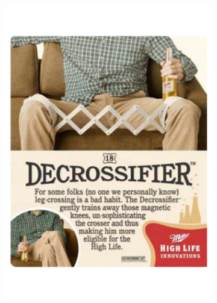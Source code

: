 \begin{figure}
\begin{subfigure}[b]{0.3\textwidth}
     \end{subfigure}
     \begin{subfigure}[b]{0.3\textwidth}
         \centering
         \includegraphics[width=\textwidth,scale=0.5]{images/humans_concreteness_img2.pdf}
         \caption{}
         

\end{subfigure}
\end{figure}
